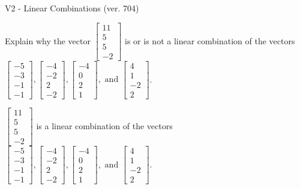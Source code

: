 \begin{exercise}
  \begin{exerciseTitle}V2 - Linear Combinations (ver. 704)\end{exerciseTitle}
  \begin{exerciseStatement}
    Explain why the vector \(\left[\begin{array}{c}
11 \\
5 \\
5 \\
-2
\end{array}\right]\)  is or is not a linear 
	combination of the vectors \(\left[\begin{array}{c}
-5 \\
-3 \\
-1 \\
-1
\end{array}\right] , \left[\begin{array}{c}
-4 \\
-2 \\
2 \\
-2
\end{array}\right] , \left[\begin{array}{c}
-4 \\
0 \\
2 \\
1
\end{array}\right] , \text{ and } \left[\begin{array}{c}
4 \\
1 \\
-2 \\
2
\end{array}\right]\).
	


  \end{exerciseStatement}
  \begin{exerciseAnswer}
   \(\left[\begin{array}{c}
11 \\
5 \\
5 \\
-2
\end{array}\right]\) 
  	 is  
	a linear combination of the vectors \(\left[\begin{array}{c}
-5 \\
-3 \\
-1 \\
-1
\end{array}\right] , \left[\begin{array}{c}
-4 \\
-2 \\
2 \\
-2
\end{array}\right] , \left[\begin{array}{c}
-4 \\
0 \\
2 \\
1
\end{array}\right] , \text{ and } \left[\begin{array}{c}
4 \\
1 \\
-2 \\
2
\end{array}\right]\).


\end{exerciseAnswer}
\end{exercise}

